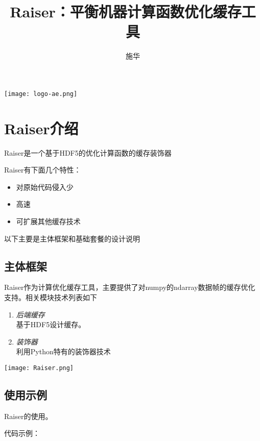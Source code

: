 \documentclass[cn,hazy,blue,14pt,screen]{elegantnote}
\title{Raiser：平衡机器计算函数优化缓存工具}
\author{施华}
\institute{Computational function optimization cache tool}
\date{\zhtoday}
\begin{document}
\maketitle

\centerline{
  \texttt{[image: logo-ae.png]}
}



\section{Raiser介绍}

Raiser是一个基于HDF5的优化计算函数的缓存装饰器

Raiser有下面几个特性：

\begin{itemize}
  \item 对原始代码侵入少
  \item 高速
  \item 可扩展其他缓存技术
\end{itemize}

以下主要是主体框架和基础套餐的设计说明



\subsection{主体框架}

Raiser作为计算优化缓存工具，主要提供了对numpy的ndarray数据帧的缓存优化支持。相关模块技术列表如下

\begin{enumerate}[label=\arabic*).]
	\item \textit{后端缓存}\\
	基于HDF5设计缓存。
	\item \textit{装饰器}\\
	利用Python特有的装饰器技术
\end{enumerate}

\centerline{
	\texttt{[image: Raiser.png]}
}








\subsection{使用示例}

Raiser的使用。

代码示例：
\end{document}
